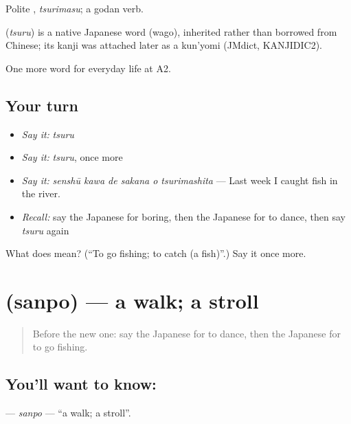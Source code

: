 Polite \textbf{}, \emph{tsurimasu}; a godan verb.

\begin{cousinweb}
\textbf{} (\emph{tsuru}) is a native Japanese word (wago), inherited rather than borrowed from Chinese; its kanji was attached later as a kun'yomi (JMdict, KANJIDIC2).
\end{cousinweb}

\begin{grammarlens}[title={What you've built}]
One more word for everyday life at A2.
\end{grammarlens}

\subsection*{Your turn}
\begin{itemize}
\raggedright
  \item \emph{Say it:} \emph{tsuru}
  \item \emph{Say it:} \emph{tsuru}, once more
  \item \emph{Say it:} \emph{senshū kawa de sakana o tsurimashita} — Last week I caught fish in the river.
  \item \emph{Recall:} say the Japanese for boring, then the Japanese for to dance, then say \emph{tsuru} again
\end{itemize}

\begin{tcolorbox}[breakable,colback=teal!4,colframe=teal!35!black,title={Before you move on}]
What does  mean? (\textquotedblleft{}To go fishing; to catch (a fish)\textquotedblright{}.) Say it once more.
\end{tcolorbox}
\section[\texorpdfstring{\ja{さんぽ} (sanpo)}{さんぽ (sanpo)}]{ (sanpo) — a walk; a stroll}

\label{lesson:JA-C239-sanpo}



\begin{quote}
Before the new one: say the Japanese for to dance, then the Japanese for to go fishing.
\end{quote}

\subsection*{You'll want to know: }
\textbf{} — \emph{sanpo} — \textquotedblleft{}a walk; a stroll\textquotedblright{}.

